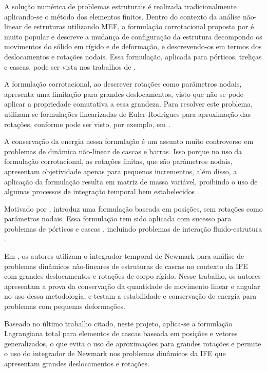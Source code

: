 \documentclass[tese_patricia.tex]{subfiles}
\begin{document}
A solução numérica de problemas estruturais é realizada tradicionalmente aplicando-se o método dos elementos finitos. Dentro do contexto da análise não-linear de estruturas utilizando MEF, a formulação corrotacional proposta por  é muito popular e descreve a mudança de configuração da estrutura decompondo os movimentos do sólido em rígido e de deformação, e descrevendo-os em termos dos deslocamentos e rotações nodais. Essa formulação, aplicada para pórticos, treliças e cascas, pode ser vista nos trabalhos de .

A formulação corrotacional, ao descrever rotações como parâmetros nodais, apresenta uma limitação para grandes deslocamentos, visto que não se pode aplicar a propriedade comutativa a essa grandeza. Para resolver este problema, utilizam-se formulações linearizadas de Euler-Rodrigues para aproximação das rotações, conforme pode ser visto, por exemplo, em .

A conservação da energia nessa formulação é um assunto muito controverso em problemas de dinâmica não-linear de cascas e barras. Isso porque no uso da formulação corrotacional, as rotações finitas, que são parâmetros nodais, apresentam objetividade apenas para pequenos incrementos, além disso, a aplicação da formulação resulta em matriz de massa variável, proibindo o uso de algumas processos de integração temporal bem estabelecidos \cite{SanchesC:2013}.

Motivado por ,  introduz uma formulação baseada em posições, sem rotações como parâmetros nodais. Essa formulação tem sido aplicada com sucesso para problemas de pórticos e cascas \cite{CodaG:2004,CodaP:2010,CarrazedoC:2010,CodaP:2011,SanchesC:2016}, incluindo problemas de interação fluido-estrutura \cite{SanchesC:2013,SanchesC:2014,FernandesCS:2019,AvanciniS:2020}.

Em , os autores utilizam o integrador temporal de Newmark para análise de problemas dinâmicos não-lineares de estruturas de cascas no contexto da IFE com grandes deslocamentos e rotações de corpo rígido. Nesse trabalho, os autores apresentam a prova da conservação da quantidade de movimento linear e angular no uso dessa metodologia, e testam a estabilidade e conservação de energia para problemas com pequenas deformações. 

Baseado no último trabalho citado, neste projeto, aplica-se a formulação Lagrangiana total para elementos de cascas baseada em posições e vetores generalizados, o que evita o uso de aproximações para grandes rotações e permite o uso do integrador de Newmark nos problemas dinâmicos da IFE que apresentam grandes deslocamentos e rotações.
\end{document}
